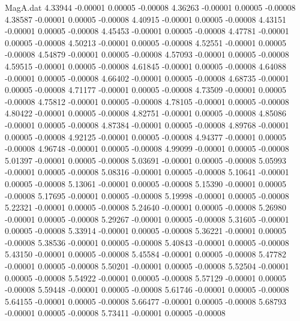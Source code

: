 \begin{filecontents}{MagA.dat}
   4.33944   -0.00001    0.00005   -0.00008
   4.36263   -0.00001    0.00005   -0.00008
   4.38587   -0.00001    0.00005   -0.00008
   4.40915   -0.00001    0.00005   -0.00008
   4.43151   -0.00001    0.00005   -0.00008
   4.45453   -0.00001    0.00005   -0.00008
   4.47781   -0.00001    0.00005   -0.00008
   4.50213   -0.00001    0.00005   -0.00008
   4.52551   -0.00001    0.00005   -0.00008
   4.54879   -0.00001    0.00005   -0.00008
   4.57093   -0.00001    0.00005   -0.00008
   4.59515   -0.00001    0.00005   -0.00008
   4.61845   -0.00001    0.00005   -0.00008
   4.64088   -0.00001    0.00005   -0.00008
   4.66402   -0.00001    0.00005   -0.00008
   4.68735   -0.00001    0.00005   -0.00008
   4.71177   -0.00001    0.00005   -0.00008
   4.73509   -0.00001    0.00005   -0.00008
   4.75812   -0.00001    0.00005   -0.00008
   4.78105   -0.00001    0.00005   -0.00008
   4.80422   -0.00001    0.00005   -0.00008
   4.82751   -0.00001    0.00005   -0.00008
   4.85086   -0.00001    0.00005   -0.00008
   4.87384   -0.00001    0.00005   -0.00008
   4.89768   -0.00001    0.00005   -0.00008
   4.92125   -0.00001    0.00005   -0.00008
   4.94377   -0.00001    0.00005   -0.00008
   4.96748   -0.00001    0.00005   -0.00008
   4.99099   -0.00001    0.00005   -0.00008
   5.01397   -0.00001    0.00005   -0.00008
   5.03691   -0.00001    0.00005   -0.00008
   5.05993   -0.00001    0.00005   -0.00008
   5.08316   -0.00001    0.00005   -0.00008
   5.10641   -0.00001    0.00005   -0.00008
   5.13061   -0.00001    0.00005   -0.00008
   5.15390   -0.00001    0.00005   -0.00008
   5.17695   -0.00001    0.00005   -0.00008
   5.19998   -0.00001    0.00005   -0.00008
   5.22321   -0.00001    0.00005   -0.00008
   5.24640   -0.00001    0.00005   -0.00008
   5.26980   -0.00001    0.00005   -0.00008
   5.29267   -0.00001    0.00005   -0.00008
   5.31605   -0.00001    0.00005   -0.00008
   5.33914   -0.00001    0.00005   -0.00008
   5.36221   -0.00001    0.00005   -0.00008
   5.38536   -0.00001    0.00005   -0.00008
   5.40843   -0.00001    0.00005   -0.00008
   5.43150   -0.00001    0.00005   -0.00008
   5.45584   -0.00001    0.00005   -0.00008
   5.47782   -0.00001    0.00005   -0.00008
   5.50201   -0.00001    0.00005   -0.00008
   5.52504   -0.00001    0.00005   -0.00008
   5.54922   -0.00001    0.00005   -0.00008
   5.57129   -0.00001    0.00005   -0.00008
   5.59448   -0.00001    0.00005   -0.00008
   5.61746   -0.00001    0.00005   -0.00008
   5.64155   -0.00001    0.00005   -0.00008
   5.66477   -0.00001    0.00005   -0.00008
   5.68793   -0.00001    0.00005   -0.00008
   5.73411   -0.00001    0.00005   -0.00008

\end{filecontents}
